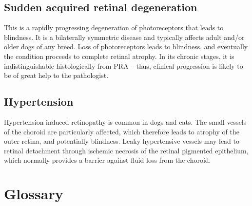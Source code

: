 \documentclass[openany]{article}
\begin{document}
\subsection{Sudden acquired retinal
degeneration}\label{sudden-acquired-retinal-degeneration}

This is a rapidly progressing degeneration of photoreceptors that leads
to blindness. It is a bilaterally symmetric disease and typically
affects adult and/or older dogs of any breed. Loss of photoreceptors
leads to blindness, and eventually the condition proceeds to complete
retinal atrophy. In its chronic stages, it is indistinguishable
histologically from PRA -- thus, clinical progression is likely to be of
great help to the pathologist.

\subsection{Hypertension}\label{hypertension}

Hypertension induced retinopathy is common in dogs and cats. The small
vessels of the choroid are particularly affected, which therefore leads
to atrophy of the outer retina, and potentially blindness. Leaky
hypertensive vessels may lead to retinal detachment through ischemic
necrosis of the retinal pigmented epithelium, which normally provides a
barrier against fluid loss from the choroid.

\hypertarget{glossary}{\section{Glossary}\label{glossary}}
\end{document}
